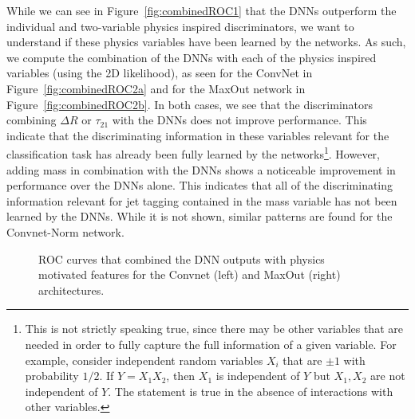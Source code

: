 While we can see in Figure~\ref{fig:combinedROC1} that the DNNs outperform the individual and two-variable physics inspired discriminators, we want to understand if these physics variables have been learned by the networks.  As such, we compute the combination of the DNNs with each of the physics inspired variables (using the 2D likelihood), as seen for the ConvNet in Figure~\ref{fig:combinedROC2a} and for the MaxOut network in Figure~\ref{fig:combinedROC2b}. In both cases, we see that the discriminators combining $\Delta R$ or $\tau_{21}$ with the DNNs does not improve performance.  This indicate that the discriminating information in these variables relevant for the classification task has already been fully learned by the networks\footnote{This is not strictly speaking true, since there may be other variables that are needed in order to fully capture the full information of a given variable.  For example, consider independent random variables $X_i$ that are $\pm 1$ with probability $1/2$.  If $Y=X_1X_2$, then $X_1$ is independent of $Y$ but $X_1,X_2$ are not independent of $Y$.  The statement is true in the absence of interactions with other variables.}.  However, adding mass in combination with the DNNs shows a noticeable improvement in performance over the DNNs alone.  This indicates that all of the discriminating information relevant for jet tagging contained in the mass variable has not been learned by the DNNs.  While it is not shown, similar patterns are found for the Convnet-Norm network.
\begin{figure}[!htbp]
  \begin{center}
\end{center}
  \caption{ROC curves that combined the DNN outputs with physics motivated features for the Convnet (left) and MaxOut (right) architectures.}
  \label{fig:combinedROC2}
\end{figure}


